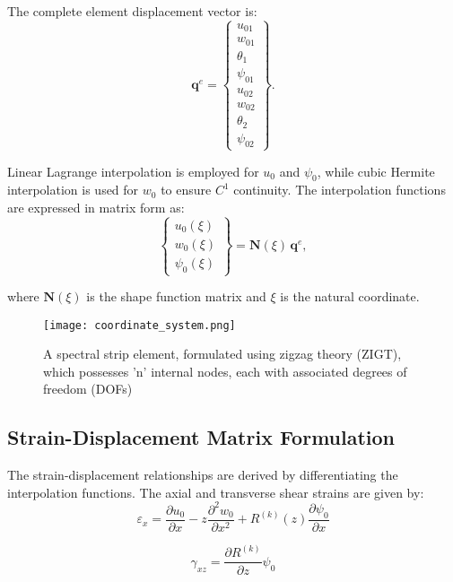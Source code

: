 \documentclass[12pt,a4paper]{report}
\begin{document}
The complete element displacement vector is:
\begin{equation}
    \mathbf{q}^e = \begin{Bmatrix} u_{01} \\ w_{01} \\ \theta_1 \\ \psi_{01} \\ u_{02} \\ w_{02} \\ \theta_2 \\ \psi_{02} \end{Bmatrix}.
\end{equation}


Linear Lagrange interpolation is employed for $u_0$ and $\psi_0$, while cubic Hermite interpolation is used for $w_0$ to ensure $C^1$ continuity. The interpolation functions are expressed in matrix form as:
\begin{equation}
   \begin{Bmatrix} u_0(\xi) \\ w_0(\xi) \\ \psi_0(\xi) \end{Bmatrix} 
= \mathbf{N}(\xi) \, \mathbf{q}^e,
\end{equation}

where $\mathbf{N}(\xi)$ is the shape function matrix and $\xi$ is the natural coordinate.

\begin{figure}[htbp]
\centering
\texttt{[image: coordinate\_system.png]}
\caption{A spectral strip element, formulated using zigzag theory (ZIGT), which possesses 'n' internal nodes, each with associated degrees of freedom (DOFs)}
\label{fig:coordinate_system}
\end{figure}

\subsection*{Strain-Displacement Matrix Formulation}

The strain-displacement relationships are derived by differentiating the interpolation functions. The axial and transverse shear strains are given by:
\begin{equation}
    \varepsilon_x = \frac{\partial u_0}{\partial x} - z \frac{\partial^2 w_0}{\partial x^2} + R^{(k)}(z)\frac{\partial \psi_0}{\partial x}
\end{equation}

\begin{equation}
    \gamma_{xz} = \frac{\partial R^{(k)}}{\partial z} \psi_0 
\end{equation}
\end{document}
